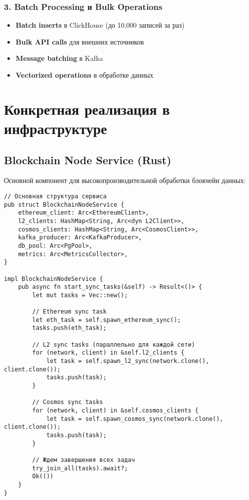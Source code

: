 \documentclass[11pt,a4paper]{article}
\begin{document}
\subsubsection{3. Batch Processing и Bulk Operations}
\begin{itemize}
    \item \textbf{Batch inserts} в ClickHouse (до 10,000 записей за раз)
    \item \textbf{Bulk API calls} для внешних источников
    \item \textbf{Message batching} в Kafka
    \item \textbf{Vectorized operations} в обработке данных
\end{itemize}

\section{Конкретная реализация в инфраструктуре}

\subsection{Blockchain Node Service (Rust)}

Основной компонент для высокопроизводительной обработки блокчейн данных:

\begin{lstlisting}[style=rustcode, caption=Архитектура Rust сервиса]
// Основная структура сервиса
pub struct BlockchainNodeService {
    ethereum_client: Arc<EthereumClient>,
    l2_clients: HashMap<String, Arc<dyn L2Client>>,
    cosmos_clients: HashMap<String, Arc<CosmosClient>>,
    kafka_producer: Arc<KafkaProducer>,
    db_pool: Arc<PgPool>,
    metrics: Arc<MetricsCollector>,
}

impl BlockchainNodeService {
    pub async fn start_sync_tasks(&self) -> Result<()> {
        let mut tasks = Vec::new();
        
        // Ethereum sync task
        let eth_task = self.spawn_ethereum_sync();
        tasks.push(eth_task);
        
        // L2 sync tasks (параллельно для каждой сети)
        for (network, client) in &self.l2_clients {
            let task = self.spawn_l2_sync(network.clone(), client.clone());
            tasks.push(task);
        }
        
        // Cosmos sync tasks
        for (network, client) in &self.cosmos_clients {
            let task = self.spawn_cosmos_sync(network.clone(), client.clone());
            tasks.push(task);
        }
        
        // Ждем завершения всех задач
        try_join_all(tasks).await?;
        Ok(())
    }
}
\end{lstlisting}
\end{document}

